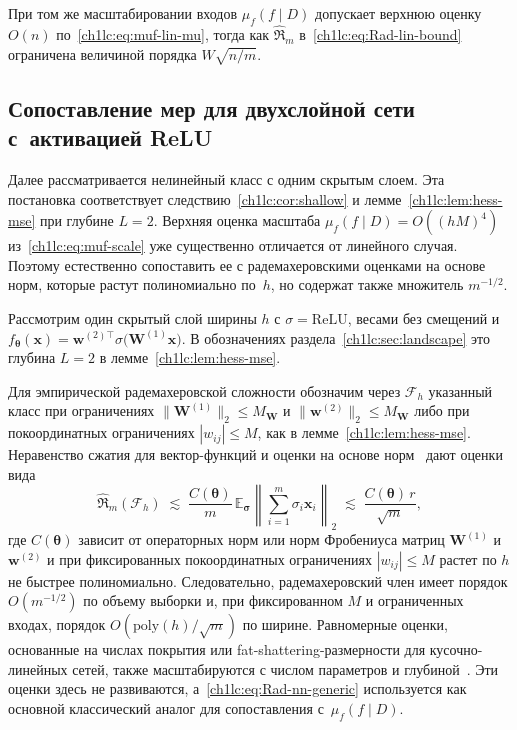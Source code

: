 При том же масштабировании входов $\mu_f(f\mid D)$ допускает верхнюю оценку $O(n)$ по~\eqref{ch1lc:eq:muf-lin-mu}, тогда как $\hat{\mathfrak{R}}_m$ в~\eqref{ch1lc:eq:Rad-lin-bound} ограничена величиной порядка $W\sqrt{n/m}$.

\subsection{Сопоставление мер для двухслойной сети с~активацией ReLU}\label{ch1lc:subsec:two-layer-comp}

Далее рассматривается нелинейный класс с одним скрытым слоем. Эта постановка соответствует следствию~\ref{ch1lc:cor:shallow} и лемме~\ref{ch1lc:lem:hess-mse} при глубине $L=2$.
Верхняя оценка масштаба $\mu_f(f\mid D)=O((hM)^4)$ из~\eqref{ch1lc:eq:muf-scale} уже существенно отличается от линейного случая. Поэтому естественно сопоставить ее с радемахеровскими оценками на основе норм, которые растут полиномиально по~$h$, но содержат также множитель $m^{-1/2}$.

Рассмотрим один скрытый слой ширины $h$ с $\sigma=\mathrm{ReLU}$, весами без смещений и
$f_{\boldsymbol{\theta}}(\mathbf{x})=\mathbf{w}^{(2)\top}\sigma\bigl(\mathbf{W}^{(1)}\mathbf{x}\bigr)$.
В обозначениях раздела~\ref{ch1lc:sec:landscape} это глубина $L=2$ в лемме~\ref{ch1lc:lem:hess-mse}.

Для эмпирической радемахеровской сложности обозначим через $\mathcal{F}_h$ указанный класс при ограничениях
$\|\mathbf{W}^{(1)}\|_2\le M_{\mathbf{W}}$ и $\|\mathbf{w}^{(2)}\|_2\le M_{\mathbf{W}}$ либо при покоординатных ограничениях $|w_{ij}|\le M$, как в лемме~\ref{ch1lc:lem:hess-mse}.
Неравенство сжатия для вектор-функций и оценки на основе норм~\cite{bartlett2002rademacher} дают оценки вида
\begin{equation}\label{ch1lc:eq:Rad-nn-generic}
  \hat{\mathfrak{R}}_m(\mathcal{F}_h)
  \;\lesssim\;
  \frac{C(\boldsymbol{\theta})}{m}\,
  \mathbb{E}_{\boldsymbol{\sigma}}\left\|
    \sum_{i=1}^{m}\sigma_i \mathbf{x}_i
  \right\|_2
  \;\lesssim\;
  \frac{C(\boldsymbol{\theta})\, r}{\sqrt{m}},
\end{equation}
где $C(\boldsymbol{\theta})$ зависит от операторных норм или норм Фробениуса матриц $\mathbf{W}^{(1)}$ и $\mathbf{w}^{(2)}$ и при фиксированных покоординатных ограничениях $|w_{ij}|\le M$ растет по $h$ не быстрее полиномиально.
Следовательно, радемахеровский член имеет порядок $O(m^{-1/2})$ по объему выборки и, при фиксированном $M$ и ограниченных входах, порядок $O(\mathrm{poly}(h)/\sqrt{m})$ по ширине.
Равномерные оценки, основанные на числах покрытия или fat-shattering-размерности для кусочно-линейных сетей, также масштабируются с числом параметров и глубиной~\cite{bartlett2002rademacher, harvey2019jmlr}. Эти оценки здесь не развиваются, а~\eqref{ch1lc:eq:Rad-nn-generic} используется как основной классический аналог для сопоставления с~$\mu_f(f\mid D)$.

